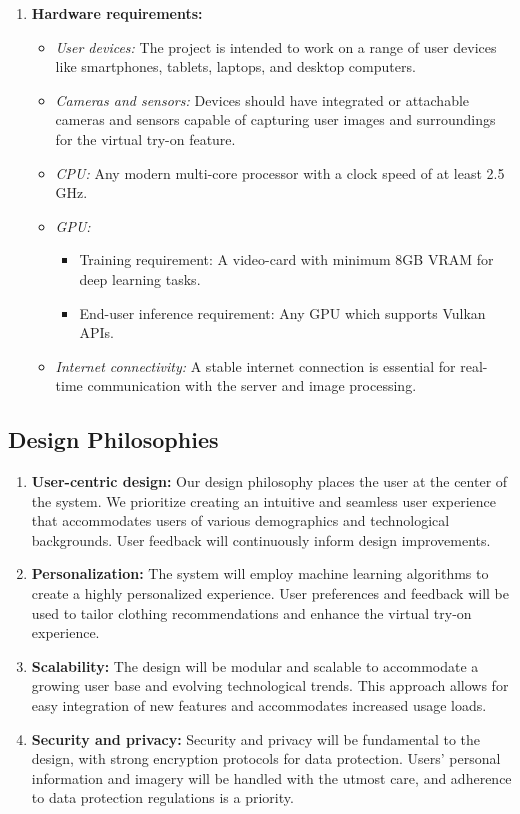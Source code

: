 \begin{enumerate}
\begin{itemize}
				\end{itemize}
			\item \textbf{Hardware requirements:}
			\begin{itemize}
				\item \textit{User devices:} The project is intended to work on a range of user devices like smartphones, tablets, laptops, and desktop computers.
				\item \textit{Cameras and sensors:} Devices should have integrated or attachable cameras and sensors capable of capturing user images and surroundings for the virtual try-on feature.
				\item \textit{CPU:} Any modern multi-core processor with a clock speed of at least 2.5 GHz.
				\item \textit{GPU:}
					\begin{itemize}
						\item Training requirement: A video-card with minimum 8GB VRAM for deep learning tasks.
						\item End-user inference requirement: Any GPU which supports Vulkan APIs.
					\end{itemize}
				\item \textit{Internet connectivity:} A stable internet connection is essential for real-time communication with the server and image processing.
			\end{itemize}
		\end{enumerate}
	
	\subsection{Design Philosophies}
		\begin{enumerate}
			\item \textbf{User-centric design:} Our design philosophy places the user at the center of the system. We prioritize creating an intuitive and seamless user experience that accommodates users of various demographics and technological backgrounds. User feedback will continuously inform design improvements.
			\item \textbf{Personalization:} The system will employ machine learning algorithms to create a highly personalized experience. User preferences and feedback will be used to tailor clothing recommendations and enhance the virtual try-on experience.
			\item \textbf{Scalability:} The design will be modular and scalable to accommodate a growing user base and evolving technological trends. This approach allows for easy integration of new features and accommodates increased usage loads.
			\item \textbf{Security and privacy:} Security and privacy will be fundamental to the design, with strong encryption protocols for data protection. Users' personal information and imagery will be handled with the utmost care, and adherence to data protection regulations is a priority.
		\end{enumerate}

